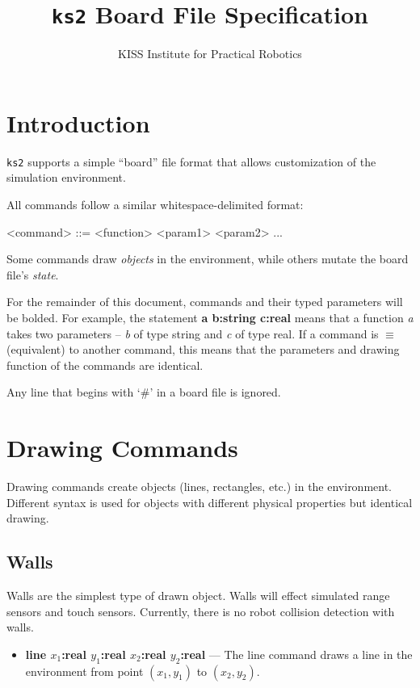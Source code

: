 \documentclass{article}
\begin{document}
  \title{\texttt{ks2} Board File Specification}
  \author{KISS Institute for Practical Robotics}
  \maketitle
  
  
  \section{Introduction}
  \texttt{ks2} supports a simple ``board'' file format
  that allows customization of the simulation environment.
  
  All commands follow a similar whitespace-delimited format:
  
  \begin{grammar}
    <command> ::= <function> <param1> <param2> ...
  \end{grammar}
  
  Some commands draw \emph{objects} in the environment, while
  others mutate the board file's \emph{state}.
  
  For the remainder of this document, commands and their typed parameters will be bolded. For example, the statement \textbf{a b:string c:real} means that a function \emph{a} takes two parameters -- \emph{b} of type string and \emph{c} of type real.
  If a command is $ \equiv $ (equivalent) to another command,
  this means that the parameters and drawing function of the
  commands are identical.
  
  Any line that begins with `\#' in a board file is ignored.
  
  \section{Drawing Commands}
  
  Drawing commands create objects (lines, rectangles, etc.) in the environment. Different syntax is used for objects with different physical properties but identical drawing.
  
  \subsection{Walls}
  
  Walls are the simplest type of drawn object. Walls will
  effect simulated range sensors and touch sensors.
  Currently, there is no robot collision detection with walls.
  
  \begin{itemize}
    \item \textbf{line $x_1$:real $y_1$:real $x_2$:real $y_2$:real} --- The line command draws a line in the environment
    from point $(x_1, y_1)$ to $(x_2, y_2)$.
  \end{itemize}
  
\end{document}
